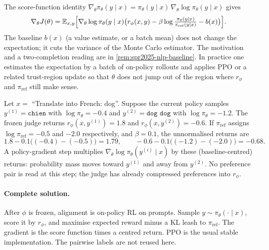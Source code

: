 \documentclass[11pt,a4paper]{article}
\theoremstyle{definition}
\begin{document}
The score-function identity \(\nabla_\theta\pi_\theta(y\mid x)=\pi_\theta(y\mid x)\,\nabla_\theta\log\pi_\theta(y\mid x)\) gives
\[
\nabla_\theta J(\theta)
=\mathbb{E}_{x,y}\Bigl[
\nabla_\theta\log\pi_\theta(y\mid x)
\bigl(
r_\phi(x,y)
-\beta\log\tfrac{\pi_\theta(y\mid x)}{\pi_{\mathrm{ref}}(y\mid x)}
-b(x)
\bigr)
\Bigr].
\]
The baseline \(b(x)\) (a value estimate, or a batch mean) does not change the expectation; it cuts the variance of the Monte Carlo estimator. The motivation and a two-completion reading are in \cref{rem:spr2025-nlp-baseline}. In practice one estimates the expectation by a batch of on-policy rollouts and applies PPO or a related trust-region update so that \(\theta\) does not jump out of the region where \(r_\phi\) and \(\pi_{\mathrm{ref}}\) still make sense.

\begin{example}
Let \(x=\) ``Translate into French: dog''. Suppose the current policy samples \(y^{(1)}=\texttt{chien}\) with \(\log\pi_\theta=-0.4\) and \(y^{(2)}=\texttt{dog dog}\) with \(\log\pi_\theta=-1.2\). The frozen judge returns \(r_\phi(x,y^{(1)})=1.8\) and \(r_\phi(x,y^{(2)})=-0.6\). If \(\pi_{\mathrm{ref}}\) assigns \(\log\pi_{\mathrm{ref}}=-0.5\) and \(-2.0\) respectively, and \(\beta=0.1\), the unnormalised returns are
\[
1.8-0.1\bigl((-0.4)-(-0.5)\bigr)=1.79,
\qquad
-0.6-0.1\bigl((-1.2)-(-2.0)\bigr)=-0.68.
\]
A policy-gradient step multiplies \(\nabla_\theta\log\pi_\theta(y^{(i)}\mid x)\) by these (baseline-centred) returns: probability mass moves toward \(y^{(1)}\) and away from \(y^{(2)}\). No preference pair is read at this step; the judge has already compressed preferences into \(r_\phi\).
\end{example}

\paragraph{Complete solution.}
After \(\phi\) is frozen, alignment is on-policy RL on prompts. Sample \(y\sim\pi_\theta(\cdot\mid x)\), score it by \(r_\phi\), and maximise expected reward minus a KL leash to \(\pi_{\mathrm{ref}}\). The gradient is the score function times a centred return. PPO is the usual stable implementation. The pairwise labels are not reused here.
\end{document}
